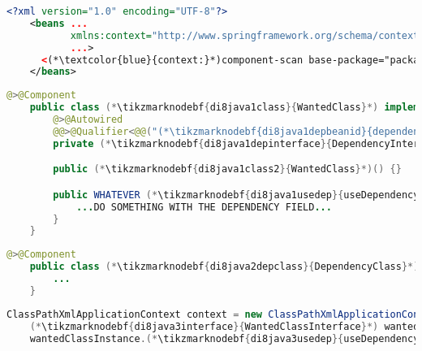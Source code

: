 \begin{lstlisting}[language=XML, title={Configuration XML}]
    <?xml version="1.0" encoding="UTF-8"?>
    <beans ...
           xmlns:context="http://www.springframework.org/schema/context"
           ...>
      <(*\textcolor{blue}{context:}*)component-scan base-package="package.subfolder"/>
    </beans>
\end{lstlisting}
\begin{lstlisting}[language=Java, title={Wanted class with the zero--parameter constructor}]
    @>@Component
    public class (*\tikzmarknodebf{di8java1class}{WantedClass}*) implements (*\tikzmarknodebf{di8java1interface}{WantedClassInterface}*) {
        @>@Autowired
        @@>@Qualifier<@@("(*\tikzmarknodebf{di8java1depbeanid}{dependencyClass}[ForestGreen]*)")
        private (*\tikzmarknodebf{di8java1depinterface}{DependencyInterface}*) dependencyField;

        public (*\tikzmarknodebf{di8java1class2}{WantedClass}*)() {}

        public WHATEVER (*\tikzmarknodebf{di8java1usedep}{useDependency}*)() {
            ...DO SOMETHING WITH THE DEPENDENCY FIELD...
        }
    }
\end{lstlisting}
\begin{lstlisting}[language=Java, title={Dependency class}]
    @>@Component
    public class (*\tikzmarknodebf{di8java2depclass}{DependencyClass}*) implements (*\tikzmarknodebf{di8java2depinterface}{DependencyInterface}*) {
        ...
    }
\end{lstlisting}
\begin{lstlisting}[language=Java, title={Usage}]
    ClassPathXmlApplicationContext context = new ClassPathXmlApplicationContext("configurationFile.xml");
    (*\tikzmarknodebf{di8java3interface}{WantedClassInterface}*) wantedClassInstance = context.getBean("(*\tikzmarknodebf{di8java3beanid}{wantedClass}[ForestGreen]*)", (*\tikzmarknodebf{di8java3interface2}{WantedClassInterface}*).class);
    wantedClassInstance.(*\tikzmarknodebf{di8java3usedep}{useDependency}*)();
\end{lstlisting}
\newpage


